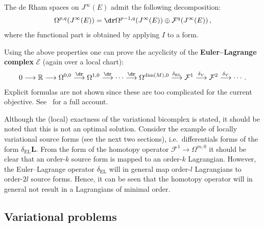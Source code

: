     \begin{result}\label{var:functional_decomposition}
        The de Rham spaces on $J^\infty(E)$ admit the following decomposition:
        \begin{gather}
            \Omega^{p,q}(J^\infty(E)) = \dr\Omega^{p-1,q}(J^\infty(E))\oplus\mathcal{F}^q(J^\infty(E))\,,
        \end{gather}
        where the functional part is obtained by applying $I$ to a form.
    \end{result}

    Using the above properties one can prove the acyclicity of the \textbf{Euler--Lagrange complex} $\mathcal{E}$ (again over a local chart):
    \begin{gather}
        0\longrightarrow\mathbb{R}\longrightarrow\Omega^{0,0}\overset{\dr}{\longrightarrow}\Omega^{1,0}\overset{\dr}{\longrightarrow}\cdots\overset{\dr}{\longrightarrow}\Omega^{\dim(M),0}\overset{\delta_\mathrm{EL}}{\longrightarrow}\mathcal{F}^1\overset{\delta_V}{\longrightarrow}\mathcal{F}^2\overset{\delta_V}{\longrightarrow}\cdots\,.
    \end{gather}
    Explicit formulas are not shown since these are too complicated for the current objective. See~\cite{anderson_variational_1992} for a full account.

    \begin{remark}
        Although the (local) exactness of the variational bicomplex is stated, it should be noted that this is not an optimal solution. Consider the example of locally variational source forms (see the next two sections), i.e.~differentials forms of the form $\delta_{\text{EL}}\mathbf{L}$. From the form of the homotopy operator $\mathcal{F}^1\rightarrow\Omega^{m,0}$ it should be clear that an order-$k$ source form is mapped to an order-$k$ Lagrangian. However, the Euler--Lagrange operator $\delta_{\text{EL}}$ will in general map order-$l$ Lagrangians to order-$2l$ source forms. Hence, it can be seen that the homotopy operator will in general not result in a Lagrangians of minimal order.
    \end{remark}

\subsection{Variational problems}

